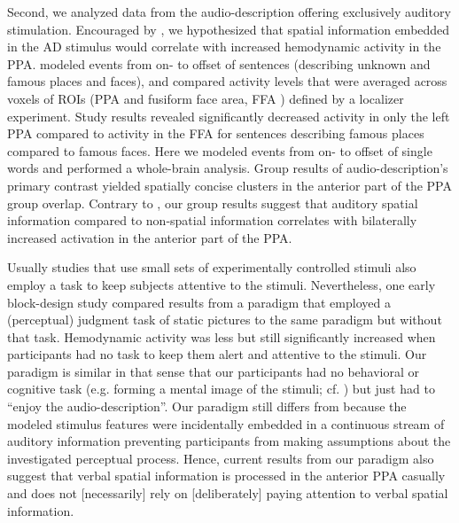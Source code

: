 \documentclass[english]{article}
\begin{document}
Second, we analyzed data from the audio-description offering exclusively
auditory stimulation.
Encouraged by \citep{aziz2008modulation}, we hypothesized that spatial
information embedded in the AD stimulus would correlate with increased
hemodynamic activity in the PPA.
\citep{aziz2008modulation} modeled events from on- to offset of sentences
(describing unknown and famous places and faces), and compared activity levels
that were averaged across voxels of ROIs (PPA and fusiform face area, FFA
\citep{kanwisher1997ffa}) defined by a localizer experiment.
Study results revealed significantly decreased activity in only the left PPA
compared to activity in the FFA for sentences describing famous places compared
to famous faces.
Here we modeled events from on- to offset of single words and performed a
whole-brain analysis.
Group results of audio-description's primary contrast yielded spatially concise
clusters in the anterior part of the PPA group overlap.
Contrary to \citep{aziz2008modulation}, our group results suggest that auditory
spatial information compared to non-spatial information correlates with
bilaterally increased activation in the anterior part of the PPA.

Usually studies that use small sets of experimentally controlled stimuli also
employ a task to keep subjects attentive to the stimuli.
Nevertheless, one early block-design study \citep{epstein1998ppa} compared
results from a paradigm that employed a (perceptual) judgment task of static
pictures to the same paradigm but without that task.
Hemodynamic activity was less but still significantly increased when
participants had no task to keep them alert and attentive to the stimuli.
Our paradigm is similar in that sense that our participants had no behavioral or
cognitive task (e.g. forming a mental image of the stimuli; cf.
\citep{ocraven2000mental})  but just had to ``enjoy the audio-description''.
Our paradigm still differs from \citep{epstein1998ppa} because the modeled
stimulus features were incidentally embedded in a continuous stream of auditory
information preventing participants from making assumptions about the
investigated perceptual process.
Hence, current results from our paradigm also suggest that verbal spatial
information is processed in the anterior PPA casually and does not [necessarily]
rely on [deliberately] paying attention to verbal spatial information.
\end{document}
